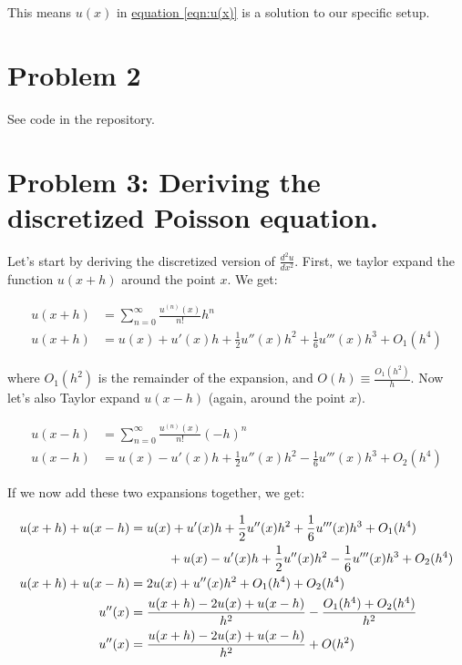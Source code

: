 \documentclass[english,notitlepage]{article}  %
\begin{document}
  This means $u(x)$ in \hyperref[eqn:u(x)]{equation \ref*{eqn:u(x)}}
   is a solution to our specific setup.

\section*{Problem 2}

See code in the repository.


\section*{Problem 3: Deriving the discretized Poisson equation.}

    Let's start by deriving the discretized version of $\frac{d^2u}{dx^2}$. First,
    we taylor expand the function $u(x+h)$ around the point $x$. We get:

    \begin{align*}
        u(x+h) &= \sum_{n=0}^{\infty} \frac{u^{(n)}(x)}{n!} h^n
        \\
        u(x+h) &= u(x) + u'(x) h + \frac{1}{2} u''(x) h^2 + \frac{1}{6} u'''(x) h^3 + O_1(h^4)
    \end{align*}

    where $O_1(h^2)$ is the remainder of the expansion, and $O(h) \equiv
    \frac{O_1(h^2)}{h}$. Now let's also Taylor expand $u(x-h)$ (again, around the
    point $x$).

    \begin{align*}
        u(x-h) &= \sum_{n=0}^{\infty} \frac{u^{(n)}(x)}{n!} (-h)^n
        \\
        u(x-h) &= u(x) - u'(x) h + \frac{1}{2} u''(x) h^2 - \frac{1}{6} u'''(x) h^3 + O_2(h^4)
    \end{align*}

    If we now add these two expansions together, we get:

    \begin{align*}
        u(x+h) + u(x-h) &= u(x) + u'(x) h + \frac{1}{2} u''(x) h^2 + \frac{1}{6} u'''(x) h^3
        + O_1(h^4)
        \\ & \hspace*{30pt} + u(x) - u'(x) h + \frac{1}{2} u''(x) h^2 - \frac{1}{6} u'''(x) h^3 + O_2(h^4)
        \\
        u(x+h) + u(x-h) &= 2u(x) + u''(x) h^2 + O_1(h^4) + O_2(h^4)
        \\
        u''(x) &= \frac{u(x+h) - 2u(x) + u(x-h)}{h^2} - \frac{O_1(h^4) + O_2(h^4)}{h^2}
        \\
        u''(x) &= \frac{u(x+h) - 2u(x) + u(x-h)}{h^2} + O(h^2)
    \end{align*}
\end{document}
